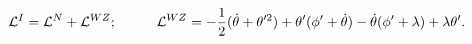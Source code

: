 \begin{equation}
 {\cal{L}}^I={\cal{L}}^N+{\cal{L}}^{WZ}; \hspace{1cm}
 {\cal{L}}^{WZ}=-\frac{1}{2}(\dot{\theta}+\theta'^2)+\theta'(\phi'+\dot{\theta})-\dot{\theta}(\phi'+\lambda)+\lambda\theta'.
 \label{a55}
 \end{equation}

